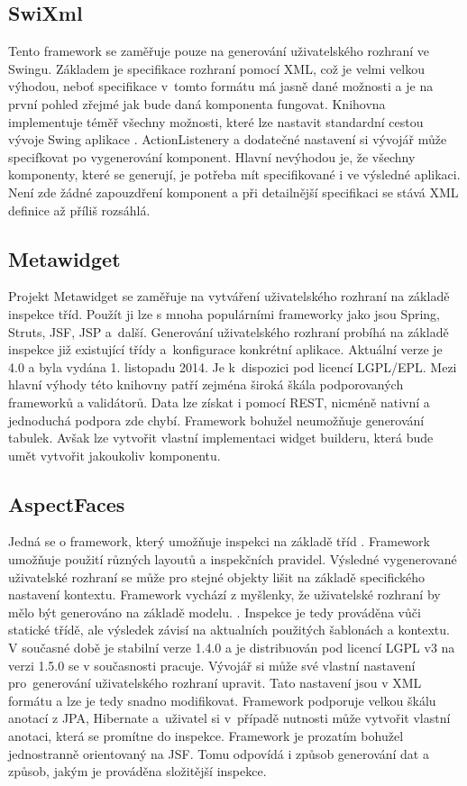 \subsection{SwiXml}
Tento framework se zaměřuje pouze na generování uživatelského rozhraní ve Swingu. Základem je specifikace rozhraní pomocí XML, což je velmi velkou výhodou, neboť specifikace v~tomto formátu má jasně dané možnosti a je na první pohled zřejmé jak bude daná komponenta fungovat. Knihovna implementuje téměř všechny možnosti, které lze nastavit standardní cestou vývoje Swing aplikace \cite{swixlm}. ActionListenery a dodatečné nastavení si vývojář může specifkovat po vygenerování komponent. Hlavní nevýhodou je, že všechny komponenty, které se generují, je potřeba mít specifikované i ve výsledné aplikaci. Není zde žádné zapouzdření komponent a při detailnější specifikaci se stává XML definice až příliš rozsáhlá.
\subsection{Metawidget}
Projekt Metawidget \cite{metawidget} se zaměřuje na vytváření uživatelského rozhraní na základě inspekce tříd. Použít ji lze s mnoha populárními frameworky jako jsou Spring, Struts, JSF, JSP a~další. Generování uživatelského rozhraní probíhá na základě inspekce již existující třídy a~konfigurace konkrétní aplikace. Aktuální verze je 4.0 a byla vydána 1. listopadu 2014. Je k~dispozici pod licencí LGPL/EPL. Mezi hlavní výhody této knihovny patří zejména široká škála podporovaných frameworků a validátorů. Data lze získat i pomocí REST, nicméně nativní a jednoduchá podpora zde chybí. Framework bohužel neumožňuje generování tabulek. Avšak lze vytvořit vlastní implementaci widget builderu, která bude umět vytvořit jakoukoliv komponentu.
\subsection{AspectFaces}
Jedná se o framework, který umožňuje inspekci na základě tříd \cite{aspectfaces}. Framework umožňuje použití různých layoutů a inspekčních pravidel. Výsledné vygenerované uživatelské rozhraní se může pro stejné objekty lišit na základě specifického nastavení kontextu. Framework vychází z myšlenky, že uživatelské rozhraní by mělo být generováno na základě modelu. \cite{aspectdriven}. Inspekce je tedy prováděna vůči statické třídě, ale výsledek závisí na aktualních použitých šablonách a kontextu. V současné době je stabilní verze 1.4.0 a je distribuován pod licencí LGPL v3 na verzi 1.5.0 se v současnosti pracuje. Vývojář si může své vlastní nastavení pro~generování uživatelského rozhraní upravit. Tato nastavení jsou v XML formátu a lze je tedy snadno modifikovat. Framework podporuje velkou škálu anotací z JPA, Hibernate a~uživatel si v~případě nutnosti může vytvořit vlastní anotaci, která se promítne do inspekce. Framework je prozatím bohužel jednostranně orientovaný na JSF. Tomu odpovídá i způsob generování dat a způsob, jakým je prováděna složitější inspekce. 
